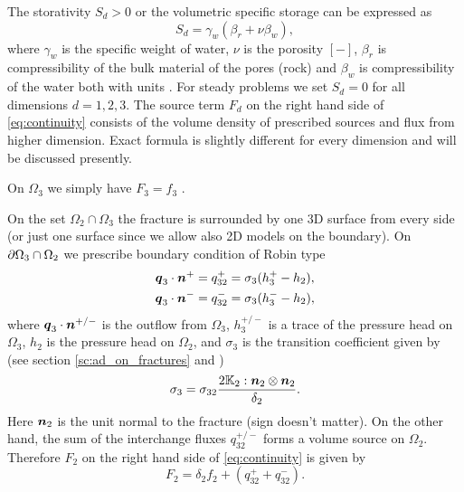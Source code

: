 The storativity $S_d>0$ or the volumetric specific storage can be expressed as
\begin{equation}
  S_d = \gamma_w(\beta_r + \nu \beta_w),
\end{equation}
where $\gamma_w$  is the specific weight of water, $\nu$ is the porosity $[-]$, $\beta_r$ is compressibility of the bulk material of the pores (rock)
and $\beta_w$ is compressibility of the water both with units . For steady problems we set $S_d=0$ for all dimensions $d=1,2,3$.
The source term $F_d$ on the right hand side of \eqref{eq:continuity} consists of the volume density of prescribed sources 
  and flux from higher dimension. 
Exact formula is slightly different for every dimension and will be discussed presently.

On $\Omega_3$ we simply have $F_3  = f_3$ .

On the set $\Omega_2 \cap \Omega_3$ the fracture is surrounded by one 3D surface from every side (or just one surface since we allow also 2D models on the boundary).
On $\partial\Omega_3 \cap \Omega_2$ we prescribe boundary condition of Robin type
\begin{align*}
        \mathbf{\boldsymbol{q}}_3\cdot \mathbf{\boldsymbol{n}}^{+} &= q_{32}^{+} =\sigma_{3} (h_3^{+}-h_2),\\
        \mathbf{\boldsymbol{q}}_3\cdot \mathbf{\boldsymbol{n}}^{-} &= q_{32}^{-} =\sigma_{3} (h_3^{-}-h_2),
\end{align*}
where $\mathbf{\boldsymbol{q}}_3\cdot\mathbf{\boldsymbol{n}}^{+/-}$  is the outflow from $\Omega_3$, $h_3^{+/-}$ is
a trace of the pressure head on $\Omega_3$, $h_2$ is the pressure head on $\Omega_2$, and 
$\sigma_{3}$  is the transition coefficient given by (see section \ref{sc:ad_on_fractures} and \cite{martin_modeling_2005})
\[
\label{e:sigma3_law}
  \sigma_3 = \sigma_{32} \frac{2\tn K_2 :\vc n_2\otimes\vc n_2 }{\delta_2}.
\]
Here $\mathbf{\boldsymbol{n}}_2$ is the unit normal to the fracture (sign doesn't matter).
On the other hand, the sum of the interchange fluxes $q_{32}^{+/-}$ forms
a volume source on $\Omega_2$.  Therefore $F_2$  on the right hand side of \eqref{eq:continuity} is
given by
\begin{equation}
   \label{source_2D}
   F_2 = \delta_2 f_2 + (q_{32}^{+} + q_{32}^{-}).
\end{equation}

